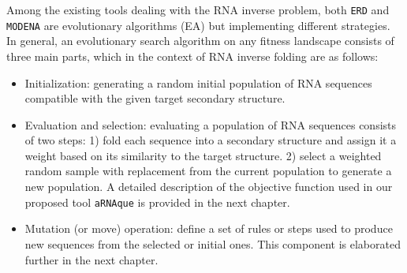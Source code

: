 Among the existing tools dealing with the RNA inverse problem, both \texttt{ERD} \cite{esmaili2014evolutionary, esmaili2015erd} and \texttt{MODENA} \cite{modena_2012} are evolutionary algorithms (EA) but implementing different strategies. 
In general, an evolutionary search algorithm on any fitness landscape consists of three main parts, which in the context of RNA inverse folding are as follows: %
\begin{itemize}
	\item Initialization: generating a random initial population of RNA sequences compatible with the given target secondary structure.
	\item Evaluation and selection: evaluating a population of RNA sequences consists of two steps: 1) fold each sequence into a secondary structure and assign it a weight based on its similarity to the target structure. 2) select a weighted random sample with replacement from the current population to generate a new population. A detailed description of the objective function used in our proposed tool \texttt{aRNAque} is provided in the next chapter. 
	\item Mutation (or move) operation: define a set of rules or steps used to produce new sequences from the selected or initial ones. This component is elaborated further in the next chapter.
	
\end{itemize}

